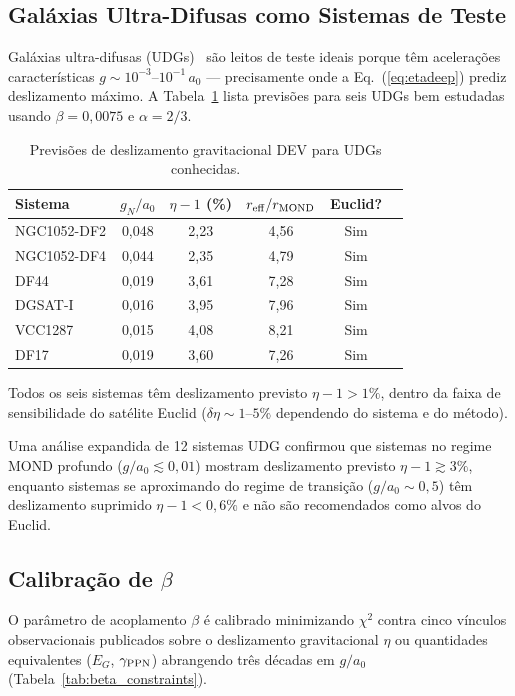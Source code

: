 \documentclass[aps,prd,twocolumn,showpacs,superscriptaddress]{revtex4-2}
\newcommand{\aO}{a_0}
\begin{document}
\subsection{Galáxias Ultra-Difusas como Sistemas de Teste}

Galáxias ultra-difusas (UDGs)~\cite{vanDokkum2015} são leitos
de teste ideais porque têm acelerações características
$g \sim 10^{-3}$--$10^{-1}\,\aO$ — precisamente onde a
Eq.~(\ref{eq:etadeep}) prediz deslizamento máximo.
A Tabela~\ref{tab:udg} lista previsões para seis UDGs bem
estudadas usando $\beta = 0{,}0075$ e $\alpha = 2/3$.

\begin{table}[h]
\caption{Previsões de deslizamento gravitacional DEV para UDGs conhecidas.}
\label{tab:udg}
\begin{ruledtabular}
\begin{tabular}{lccccc}
Sistema & $g_N/\aO$ & $\eta-1$ (\%) & $r_{\rm eff}/r_{\rm MOND}$ & Euclid? \\
\hline
NGC1052-DF2 & 0,048 & 2,23 & 4,56 & Sim \\
NGC1052-DF4 & 0,044 & 2,35 & 4,79 & Sim \\
DF44        & 0,019 & 3,61 & 7,28 & Sim \\
DGSAT-I     & 0,016 & 3,95 & 7,96 & Sim \\
VCC1287     & 0,015 & 4,08 & 8,21 & Sim \\
DF17        & 0,019 & 3,60 & 7,26 & Sim \\
\end{tabular}
\end{ruledtabular}
\end{table}

Todos os seis sistemas têm deslizamento previsto $\eta - 1 > 1\%$,
dentro da faixa de sensibilidade do satélite Euclid
($\delta\eta \sim 1$--$5\%$ dependendo do sistema e do método).

Uma análise expandida de 12 sistemas UDG confirmou que sistemas
no regime MOND profundo ($g/\aO \lesssim 0{,}01$) mostram
deslizamento previsto $\eta - 1 \gtrsim 3\%$, enquanto sistemas
se aproximando do regime de transição ($g/\aO \sim 0{,}5$) têm
deslizamento suprimido $\eta-1 < 0{,}6\%$ e não são recomendados
como alvos do Euclid.

\subsection{Calibração de $\beta$}

O parâmetro de acoplamento $\beta$ é calibrado minimizando $\chi^2$
contra cinco vínculos observacionais publicados sobre o deslizamento
gravitacional $\eta$ ou quantidades equivalentes ($E_G$,
$\gamma_{\rm PPN}$) abrangendo três décadas em $g/\aO$
(Tabela~\ref{tab:beta_constraints}).
\end{document}
